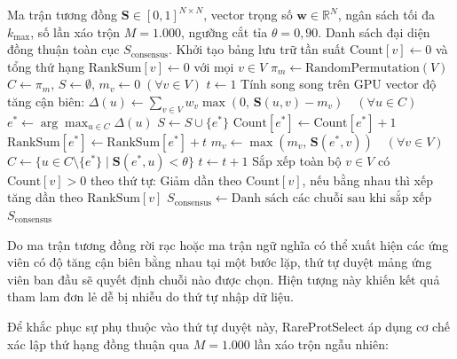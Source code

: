 \begin{algorithm}[t]
\caption{Giải thuật Pruned Greedy 90\% trên GPU với cơ chế xác lập thứ hạng đồng thuận 1.000 lần xáo trộn}
\label{alg:gpu_pruned_greedy}
\small
\begin{algorithmic}[1]
\Require Ma trận tương đồng $\mathbf{S} \in [0, 1]^{N \times N}$, vector trọng số $\mathbf{w} \in \mathbb{R}^N$, ngân sách tối đa $k_{\max}$, số lần xáo trộn $M = 1.000$, ngưỡng cắt tỉa $\theta = 0{,}90$.
\Ensure Danh sách đại diện đồng thuận toàn cục $S_{\text{consensus}}$.
\State Khởi tạo bảng lưu trữ tần suất $\text{Count}[v] \gets 0$ và tổng thứ hạng $\text{RankSum}[v] \gets 0$ với mọi $v \in V$
    \State $\pi_m \gets \text{RandomPermutation}(V)$ 
    \State $C \gets \pi_m$, \quad $S \gets \emptyset$, \quad $m_v \gets 0 \; (\forall v \in V)$
    \State $t \gets 1$
        \State Tính song song trên GPU vector độ tăng cận biên:
        \Statex \qquad\quad $\Delta(u) \gets \sum_{v \in V} w_v \max\left(0, \, \mathbf{S}(u, v) - m_v\right) \quad (\forall u \in C)$
        \State $e^* \gets \arg\max_{u \in C} \Delta(u)$ 
        \State $S \gets S \cup \{e^*\}$
        \State $\text{Count}[e^*] \gets \text{Count}[e^*] + 1$
        \State $\text{RankSum}[e^*] \gets \text{RankSum}[e^*] + t$
        \State $m_v \gets \max(m_v, \, \mathbf{S}(e^*, v)) \quad (\forall v \in V)$ 
        \State $C \gets \{u \in C \setminus \{e^*\} \mid \mathbf{S}(e^*, u) < \theta\}$ 
        \State $t \gets t + 1$
    \EndWhile
\EndFor
\State Sắp xếp toàn bộ $v \in V$ có $\text{Count}[v] > 0$ theo thứ tự:
\Statex \qquad\quad Giảm dần theo $\text{Count}[v]$, nếu bằng nhau thì xếp tăng dần theo $\text{RankSum}[v]$
\State $S_{\text{consensus}} \gets \text{Danh sách các chuỗi sau khi sắp xếp}$
\State \Return $S_{\text{consensus}}$
\end{algorithmic}
\end{algorithm}

Do ma trận tương đồng rời rạc hoặc ma trận ngữ nghĩa có thể xuất hiện các ứng viên có độ tăng cận biên bằng nhau tại một bước lặp, thứ tự duyệt mảng ứng viên ban đầu sẽ quyết định chuỗi nào được chọn. Hiện tượng này khiến kết quả tham lam đơn lẻ dễ bị nhiễu do thứ tự nhập dữ liệu.

Để khắc phục sự phụ thuộc vào thứ tự duyệt này, RareProtSelect áp dụng cơ chế xác lập thứ hạng đồng thuận qua $M = 1.000$ lần xáo trộn ngẫu nhiên:

